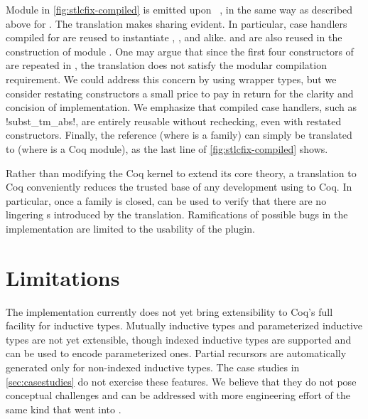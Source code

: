 Module  in \cref{fig:stlcfix-compiled} is emitted upon
~, in the same way as described above for .
The translation makes sharing evident.
In particular, case handlers compiled for 
are reused to instantiate , , and alike.
 and 
are also reused in the construction of module .
%
One may argue that since the first four constructors of  are
repeated in , the translation does not satisfy the
modular compilation requirement.
We could address this concern by using wrapper types,
but we consider restating constructors a small price to pay in return
for the clarity and concision of implementation.
We emphasize that compiled case handlers, such as \lsti!subst\_tm_abs!,
are entirely reusable without rechecking, even with restated constructors.
%
Finally, the reference  (where  is a family)
can simply be translated to  (where  is a Coq module),
as the last line of \cref{fig:stlcfix-compiled} shows.


Rather than modifying the Coq kernel to extend its core theory, a translation to
Coq conveniently reduces the trusted base of any development using \Lang to Coq.
In particular, once a family is closed,  can be used
to verify that there are no lingering s introduced by the translation.
Ramifications of possible bugs in the \Lang implementation are limited to
the usability of the plugin.


\section{Limitations}
\label{sec:limitations}

The \Lang implementation currently does not yet bring extensibility to Coq's full
facility for inductive types.
Mutually inductive types and parameterized inductive types are not yet extensible,
though indexed inductive types are supported and can be used to encode parameterized ones.
Partial recursors are automatically generated only for non-indexed inductive types.
The case studies in \cref{sec:casestudies} do not exercise these features.
We believe that they do not pose conceptual challenges and can be
addressed with more engineering effort of the same kind that went into \Lang.

